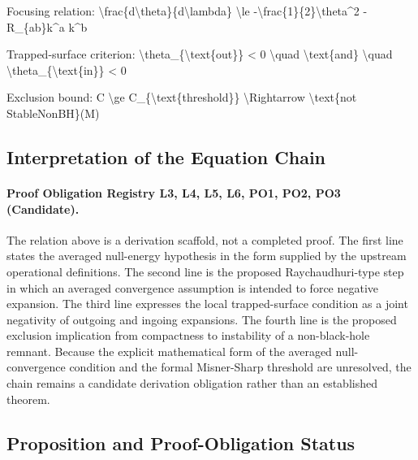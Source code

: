 \documentclass[conference]{IEEEtran}
\begin{document}
Focusing relation: \textbackslash{}frac\{d\textbackslash{}theta\}\{d\textbackslash{}lambda\} \textbackslash{}le -\textbackslash{}frac\{1\}\{2\}\textbackslash{}theta\textasciicircum{}2 - R\_\{ab\}k\textasciicircum{}a k\textasciicircum{}b

Trapped-surface criterion: \textbackslash{}theta\_\{\textbackslash{}text\{out\}\} < 0 \textbackslash{}quad \textbackslash{}text\{and\} \textbackslash{}quad \textbackslash{}theta\_\{\textbackslash{}text\{in\}\} < 0

Exclusion bound: C \textbackslash{}ge C\_\{\textbackslash{}text\{threshold\}\} \textbackslash{}Rightarrow \textbackslash{}text\{not StableNonBH\}(M)

\subsection{Interpretation of the Equation Chain}
\paragraph{Proof Obligation Registry L3, L4, L5, L6, PO1, PO2, PO3 (Candidate).} The relation above is a derivation scaffold, not a completed proof. The first line states the averaged null-energy hypothesis in the form supplied by the upstream operational definitions. The second line is the proposed Raychaudhuri-type step in which an averaged convergence assumption is intended to force negative expansion. The third line expresses the local trapped-surface condition as a joint negativity of outgoing and ingoing expansions. The fourth line is the proposed exclusion implication from compactness to instability of a non-black-hole remnant. Because the explicit mathematical form of the averaged null-convergence condition and the formal Misner-Sharp threshold are unresolved, the chain remains a candidate derivation obligation rather than an established theorem.~\cite{cite_0ed84243cf171bc4}

\subsection{Proposition and Proof-Obligation Status}
\end{document}
